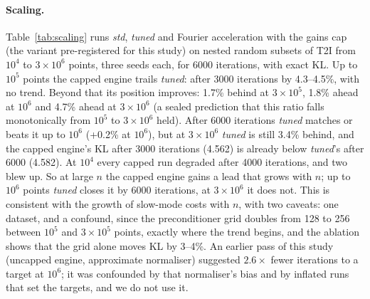 \documentclass[11pt]{article}
\begin{document}
\paragraph{Scaling.} Table~\ref{tab:scaling} runs \emph{std}, \emph{tuned} and Fourier acceleration with the gains
cap (the variant pre-registered for this study) on nested random subsets of T2I from $10^4$ to $3\times10^6$
points, three seeds each, for 6000 iterations, with exact KL. Up to $10^5$ points the capped engine trails
\emph{tuned}: after 3000 iterations by 4.3--4.5\%, with no trend. Beyond that its position improves: 1.7\% behind at
$3\times10^5$, 1.8\% ahead at $10^6$ and 4.7\% ahead at $3\times10^6$ (a sealed prediction that this ratio falls
monotonically from $10^5$ to $3\times10^6$ held). After 6000 iterations \emph{tuned} matches or beats it up to $10^6$
(+0.2\% at $10^6$), but at $3\times10^6$ \emph{tuned} is still 3.4\% behind, and the capped engine's KL after 3000
iterations (4.562) is already below \emph{tuned}'s after 6000 (4.582). At $10^4$ every capped run degraded after 4000
iterations, and two blew up. So at large $n$
the capped engine gains a lead that grows with $n$; up to $10^6$ points \emph{tuned} closes it by 6000 iterations, at
$3\times10^6$ it does not. This is consistent with the growth of slow-mode costs with $n$, with two caveats: one dataset,
and a confound, since the preconditioner grid doubles from 128 to 256 between $10^5$ and $3\times10^5$ points, exactly
where the trend begins, and the ablation shows that the grid alone moves KL by 3--4\%. An earlier pass of
this study (uncapped engine, approximate normaliser) suggested $2.6\times$ fewer iterations to a target at $10^6$;
it was confounded by that normaliser's bias and by inflated runs that set the targets, and we do not use it.
\begin{table}[t]\centering\small\resizebox{\linewidth}{!}{}
\caption{Scaling on nested T2I subsets (three seeds, medians): exact KL after 1000, 3000 and 6000 iterations, and
the change of Fourier acceleration (with the gains cap) against \emph{tuned}. ``div.'': diverged.}\label{tab:scaling}\end{table}
\end{document}
